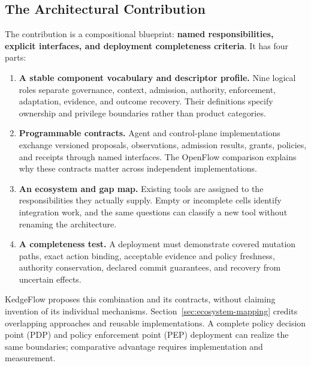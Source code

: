 
\subsection{The Architectural Contribution}
The contribution is a compositional blueprint: \textbf{named responsibilities, explicit interfaces, and deployment completeness criteria}. It has four parts:
\begin{enumerate}
\item \textbf{A stable component vocabulary and descriptor profile.} Nine logical roles separate governance, context, admission, authority, enforcement, adaptation, evidence, and outcome recovery. Their definitions specify ownership and privilege boundaries rather than product categories.
\item \textbf{Programmable contracts.} Agent and control-plane implementations exchange versioned proposals, observations, admission results, grants, policies, and receipts through named interfaces. The OpenFlow comparison explains why these contracts matter across independent implementations.
\item \textbf{An ecosystem and gap map.} Existing tools are assigned to the responsibilities they actually supply. Empty or incomplete cells identify integration work, and the same questions can classify a new tool without renaming the architecture.
\item \textbf{A completeness test.} A deployment must demonstrate covered mutation paths, exact action binding, acceptable evidence and policy freshness, authority conservation, declared commit guarantees, and recovery from uncertain effects.
\end{enumerate}

KedgeFlow proposes this combination and its contracts, without claiming invention of its individual mechanisms. Section~\ref{sec:ecosystem-mapping} credits overlapping approaches and reusable implementations. A complete policy decision point (PDP) and policy enforcement point (PEP) deployment can realize the same boundaries; comparative advantage requires implementation and measurement.

